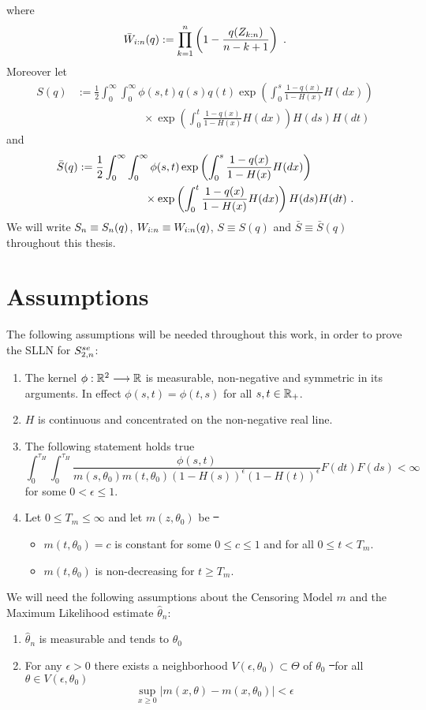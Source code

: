 where 
$$\bar{W}_{i:n}(q) := \prod_{k=1}^{n}\left(1-\frac{q(Z_{k:n})}{n-k+1}\right)\textrm{ .}$$
Moreover let
\begin{align*}
S(q) &:= \frac{1}{2}\int_{0}^{\infty} \int_{0}^{\infty} \phi(s,t) q(s)q(t) \exp\left(\int_{0}^{s} \frac{1-q(x)}{1-H(x)} H(dx)\right)\\
&\qquad\qquad\qquad \times \exp\left(\int_{0}^{t} \frac{1-q(x)}{1-H(x)} H(dx) \right)H(ds)H(dt)
\end{align*}
and 
\begin{align*}
\bar{S}(q) &:= \frac{1}{2}\int_{0}^{\infty} \int_{0}^{\infty} \phi(s,t)  \exp\left(\int_{0}^{s} \frac{1-q(x)}{1-H(x)} H(dx)\right)\\
&\qquad\qquad\qquad \times \exp\left(\int_{0}^{t} \frac{1-q(x)}{1-H(x)} H(dx) \right)H(ds)H(dt)\textrm{ .}
\end{align*}
We will write $S_{n} \equiv S_{n}(q)$, $W_{i:n} \equiv W_{i:n}(q)$, $S\equiv S(q)$ and $\bar S\equiv \bar S(q)$ throughout this thesis.
%
\section{Assumptions}
The following assumptions will be needed throughout this work, in order to prove the SLLN for $S_{2,n}^{se}$:
\begin{enumerate}[({A}1)]
	\item \label{ass:kernel_gen} The kernel $\phi: \mathbb{R}^2 \longrightarrow \mathbb{R}$ is measurable, non-negative and symmetric in its arguments. In effect $\phi(s,t) = \phi(t,s)$ for all $s,t \in \mathbb{R}_+$. 
	\item \label{ass:H_nonneg} $H$ is continuous and concentrated on the non-negative real line.
	\item \label{ass:intgral_phi_q} The following statement holds true
	$$\int_{0}^{\tau_H} \int_{0}^{\tau_H} \frac{\phi(s,t)}{m(s, \theta_0)m(t,\theta_0)(1-H(s))^\epsilon(1-H(t))^{\epsilon}} F(dt)F(ds) < \infty$$
	for some $0<\epsilon\leq 1$.
	\item \label{ass:m_increas} Let $0\leq T_m \leq \infty$ and let $m(z,\theta_0)$ be \st\ 
		\begin{itemize}
		\item $m(t, \theta_0) = c$ is constant for some $0\leq c \leq 1$ and for all $0\leq t< T_m$. 
		\item $m(t, \theta_0)$ is non-decreasing for $t\geq T_m$. 
		\end{itemize} 
\end{enumerate}
%
\clearpage
We will need the following assumptions about the Censoring Model $m$ and the Maximum Likelihood estimate $\hat\theta_n$:
\begin{enumerate}[({M}1)]
	\item \label{ass:m_consistency} $\hat{\theta}_n$ is measurable and tends to $\theta_0$
	\item \label{ass:m_nbhd} For any $\epsilon>0$ there exists a neighborhood $V(\epsilon, \theta_0)\subset \Theta$ of $\theta_0$ \st\ for all $\theta\in V(\epsilon, \theta_0)$ 
	$$\sup\limits_{x\geq 0} |m(x, \theta) - m(x, \theta_0)| < \epsilon$$
\end{enumerate}
